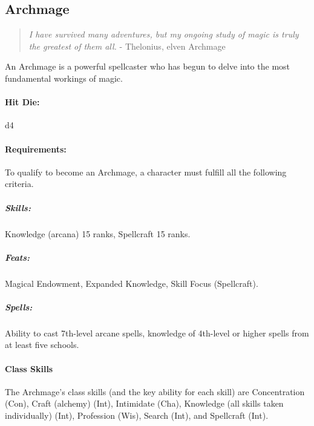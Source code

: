 \subsection{Archmage}
\begin{quote}
\emph{I have survived many adventures, but my ongoing study of magic is truly the greatest of them all.}
- Thelonius, elven Archmage
\end{quote}
An Archmage is a powerful spellcaster who has begun to delve into the most fundamental workings of magic.

\begin{table*}
\centering
\caption{The Archmage}
\label{tab:Archmage}
\end{table*}

\paragraph{Hit Die:} d4
\paragraph{Requirements:}
To qualify to become an Archmage, a character must fulfill all the following criteria.
\subparagraph{Skills:} Knowledge (arcana) 15 ranks, Spellcraft 15 ranks.
\subparagraph{Feats:} Magical Endowment, Expanded Knowledge, Skill Focus (Spellcraft).
\subparagraph{Spells:} Ability to cast 7th-level arcane spells, knowledge of 4th-level or higher spells from at least five schools.
\paragraph{Class Skills}
The Archmage's class skills (and the key ability for each skill) are Concentration (Con), Craft (alchemy) (Int), 
Intimidate (Cha), Knowledge (all skills taken individually) (Int), Profession (Wis), Search (Int), and Spellcraft (Int). 
